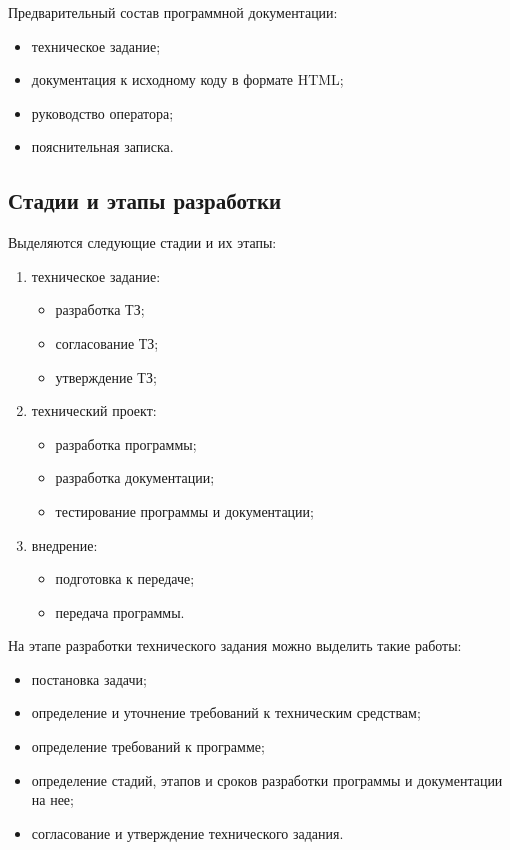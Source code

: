 Предварительный состав программной документации:
\begin{itemize}
    \item техническое задание;
    \item документация к исходному коду в формате HTML;
    \item руководство оператора;
    \item пояснительная записка.
\end{itemize}


\subsection{Стадии и этапы разработки}


Выделяются следующие стадии и их этапы:
\begin{enumerate}
    \item техническое задание:
        \begin{itemize}
            \item разработка ТЗ;
            \item согласование ТЗ;
            \item утверждение ТЗ;
        \end{itemize}
    \item технический проект:
        \begin{itemize}
            \item разработка программы;
            \item разработка документации;
            \item тестирование программы и документации;
        \end{itemize}
    \item внедрение:
        \begin{itemize}
            \item подготовка к передаче;
            \item передача программы.
        \end{itemize}
\end{enumerate}

На этапе разработки технического задания можно выделить такие работы:
\begin{itemize}
    \item постановка задачи;
    \item определение и уточнение требований к техническим средствам;
    \item определение требований к программе;
    \item определение стадий, этапов и сроков разработки программы и
        документации на нее;
    \item согласование и утверждение технического задания.
\end{itemize}


